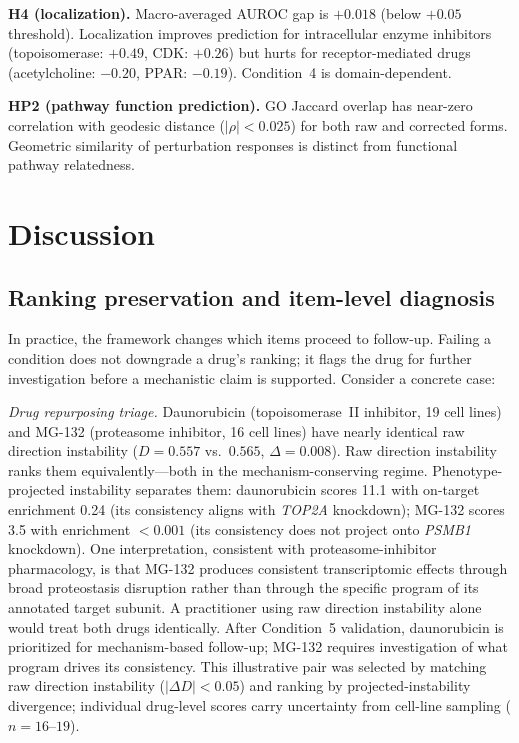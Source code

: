 \documentclass[11pt]{article}
\begin{document}
\textbf{H4 (localization).} Macro-averaged AUROC gap is $+0.018$ (below $+0.05$ threshold). Localization
improves prediction for intracellular enzyme inhibitors (topoisomerase:
$+0.49$, CDK: $+0.26$) but hurts for receptor-mediated drugs
(acetylcholine: $-0.20$, PPAR: $-0.19$). Condition~4 is domain-dependent.

\textbf{HP2 (pathway function prediction).} GO Jaccard overlap has near-zero correlation with geodesic distance
($|\rho| < 0.025$) for both raw and corrected forms. Geometric similarity
of perturbation responses is distinct from functional pathway relatedness.

\section{Discussion}

\subsection{Ranking preservation and item-level diagnosis}

In practice, the framework changes which items proceed to follow-up.
Failing a condition does not downgrade a drug's ranking; it flags the drug
for further investigation before a mechanistic claim is supported.
Consider a concrete case:

\emph{Drug repurposing triage.} Daunorubicin (topoisomerase~II inhibitor,
19 cell lines) and MG-132 (proteasome inhibitor, 16 cell lines) have
nearly identical raw direction instability ($D = 0.557$ vs.\ $0.565$,
$\Delta = 0.008$). Raw direction instability ranks them equivalently---both in the
mechanism-conserving regime. Phenotype-projected instability separates them:
daunorubicin scores 11.1 with on-target enrichment 0.24 (its consistency
aligns with \emph{TOP2A} knockdown); MG-132 scores 3.5 with enrichment
$< 0.001$ (its consistency does not project onto \emph{PSMB1} knockdown).
One interpretation, consistent with proteasome-inhibitor pharmacology, is
that MG-132 produces consistent transcriptomic effects through broad
proteostasis disruption rather than through the specific program of its
annotated target subunit. A practitioner using raw direction instability alone would
treat both drugs identically. After Condition~5 validation, daunorubicin is
prioritized for mechanism-based follow-up; MG-132 requires investigation
of what program drives its consistency. This illustrative pair was selected
by matching raw direction instability ($|\Delta D| < 0.05$) and ranking by projected-instability
divergence; individual drug-level scores carry uncertainty from cell-line
sampling ($n = 16$--$19$).
\end{document}
